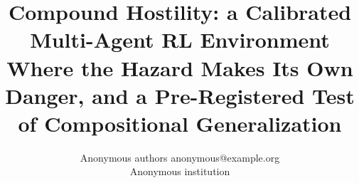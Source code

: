 \documentclass[10pt]{article}
\title{Compound Hostility: a Calibrated Multi-Agent RL Environment Where the
Hazard Makes Its Own Danger, and a Pre-Registered Test of Compositional
Generalization}
\author{\name Anonymous authors \email anonymous@example.org \\
      \addr Anonymous institution}
\theoremstyle{plain}
\theoremstyle{definition}
\begin{document}
\maketitle

\begin{abstract}

\end{abstract}
















\newpage
\appendix

\end{document}
